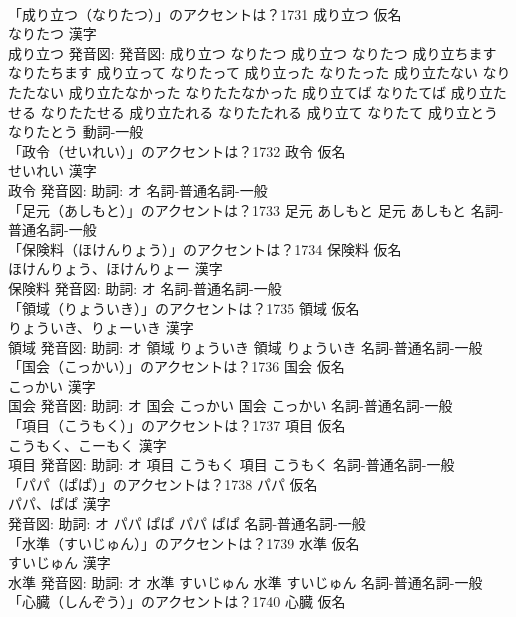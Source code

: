 \documentclass[8pt]{extreport}
\begin{document}
\begin{CJK}{UTF8}{min}
\\	「成り立つ（なりたつ）」のアクセントは？1731	成り立つ 仮名　
\\	なりたつ 漢字　
\\	成り立つ 発音図: 発音図:	成り立つ なりたつ		成り立つ なりたつ 成り立ちます なりたちます 成り立って なりたって 成り立った なりたった 成り立たない なりたたない 成り立たなかった なりたたなかった 成り立てば なりたてば 成り立たせる なりたたせる 成り立たれる なりたたれる 成り立て なりたて 成り立とう なりたとう				動詞-一般 
\\	「政令（せいれい）」のアクセントは？1732	政令 仮名　
\\	せいれい 漢字　
\\	政令 発音図: 助詞: オ							名詞-普通名詞-一般 
\\	「足元（あしもと）」のアクセントは？1733		足元 あしもと		足元 あしもと				名詞-普通名詞-一般 
\\	「保険料（ほけんりょう）」のアクセントは？1734	保険料 仮名　
\\	ほけんりょう、ほけんりょー 漢字　
\\	保険料 発音図: 助詞: オ							名詞-普通名詞-一般 
\\	「領域（りょういき）」のアクセントは？1735	領域 仮名　
\\	りょういき、りょーいき 漢字　
\\	領域 発音図: 助詞: オ	領域 りょういき		領域 りょういき				名詞-普通名詞-一般 
\\	「国会（こっかい）」のアクセントは？1736	国会 仮名　
\\	こっかい 漢字　
\\	国会 発音図: 助詞: オ	国会 こっかい		国会 こっかい				名詞-普通名詞-一般 
\\	「項目（こうもく）」のアクセントは？1737	項目 仮名　
\\	こうもく、こーもく 漢字　
\\	項目 発音図: 助詞: オ	項目 こうもく		項目 こうもく				名詞-普通名詞-一般 
\\	「パパ（ぱぱ）」のアクセントは？1738	パパ 仮名　
\\	パパ、ぱぱ 漢字　
\\	発音図: 助詞: オ	パパ ぱぱ		パパ ぱぱ				名詞-普通名詞-一般 
\\	「水準（すいじゅん）」のアクセントは？1739	水準 仮名　
\\	すいじゅん 漢字　
\\	水準 発音図: 助詞: オ	水準 すいじゅん		水準 すいじゅん				名詞-普通名詞-一般 
\\	「心臓（しんぞう）」のアクセントは？1740	心臓 仮名　

\end{CJK}
\end{document}
